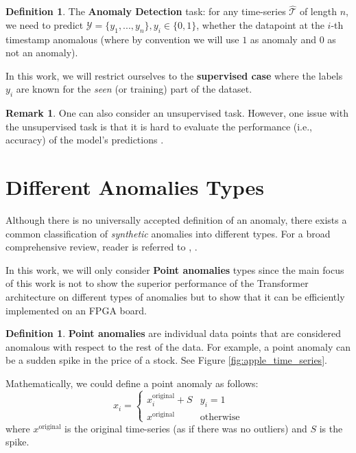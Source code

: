 \documentclass[a4paper, twoside]{report}
\theoremstyle{definition}
\newtheorem{definition}[theorem]{Definition}
\newtheorem{remark}[theorem]{Remark}
\numberwithin{equation}{section}
\begin{document}
\begin{definition}
    The \textbf{Anomaly Detection} task:
    for any time-series $\hat{\mathcal{T}}$ of length $n$, we need to predict $\mathcal{Y} = \{y_1, . . . , y_n \}, y_i \in \{0, 1\}$,
    whether the datapoint at the $i$-th timestamp anomalous (where by convention we will use $1$ as anomaly and $0$ as not an anomaly).
\end{definition}
In this work, we will restrict ourselves to the \textbf{supervised case}
where the labels $y_i$ are known for the \emph{seen} (or training) part of the dataset.

\begin{remark}
    One can also consider an unsupervised task.
    However, one issue with the unsupervised task is that it is hard to evaluate
    the performance (i.e., accuracy) of the model's predictions \cite{1905.05667}.
\end{remark}


\section{Different Anomalies Types}

Although there is no universally accepted definition of an anomaly,
there exists a common classification of \textit{synthetic} anomalies into different types. For a broad comprehensive review,
reader is referred to \cite{Steinbuss2020GeneratingAO}, \cite{Schmidl2022AnomalyDI}.

In this work, we will only consider \textbf{Point anomalies} types since
the main focus of this work is not to show the superior performance of the Transformer architecture
on different types of anomalies
but to show that it can be efficiently implemented on an FPGA board.

\begin{definition}
    \textbf{Point anomalies} are individual data points that are considered anomalous with respect to the rest of the data.
    For example, a point anomaly can be a sudden spike in the price of a stock. See Figure \ref{fig:apple_time_series}.

    Mathematically, we could define a point anomaly as follows:
    \begin{equation}
        x_i = \begin{cases}
            x^{\text{original}}_i + S & y_i=1            \\
            x^{\text{original}}       & \text{otherwise}
        \end{cases}
    \end{equation}
    where $x^{\text{original}}$ is the original time-series (as if there was no outliers)
    and $S$ is the spike.

\end{definition}
\end{document}
